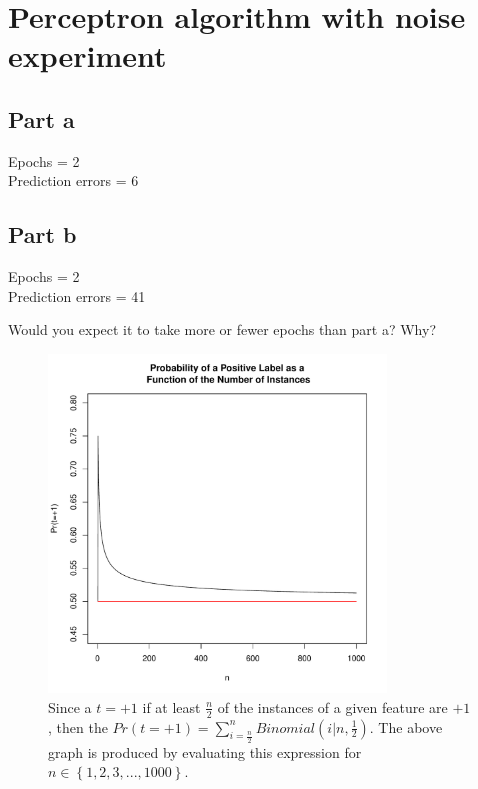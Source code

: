 \documentclass{article}
\begin{document}
\clearpage
\section{Perceptron algorithm with noise experiment}

\subsection*{Part a}
Epochs = 2 \\
Prediction errors = 6

\subsection*{Part b}

Epochs = 2 \\
Prediction errors = 41

\noindent Would you expect it to take more or fewer epochs than part a? Why?

\begin{figure}[h!]
\centering
\includegraphics[width=0.8\textwidth]{bFig.pdf}
\caption{Since a $t=+1$ if at least $\frac{n}{2}$ of the instances of a given feature are $+1$, then the \mbox{$Pr(t=+1)=\sum_{i=\frac{n}{2}}^n Binomial(i|n,\frac{1}{2})$.}
The above graph is produced by evaluating this expression for \mbox{$n\in\left\{1,2,3,...,1000\right\}$.}
}
\label{bFig}
\end{figure}
\end{document}
